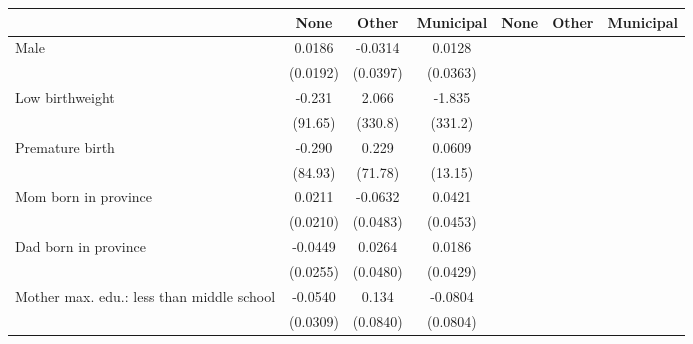 {
\def\sym#1{\ifmmode^{#1}\else\(^{#1}\)\fi}
\begin{tabular}{l*{6}{c}}
\toprule
                    &\multicolumn{1}{c}{None}&\multicolumn{1}{c}{Other}&\multicolumn{1}{c}{Municipal}&\multicolumn{1}{c}{None}&\multicolumn{1}{c}{Other}&\multicolumn{1}{c}{Municipal}\\
\midrule
Male                &      0.0186         &     -0.0314         &      0.0128         &                     &                     &                     \\
                    &    (0.0192)         &    (0.0397)         &    (0.0363)         &                     &                     &                     \\
\addlinespace
Low birthweight     &      -0.231         &       2.066         &      -1.835         &                     &                     &                     \\
                    &     (91.65)         &     (330.8)         &     (331.2)         &                     &                     &                     \\
\addlinespace
Premature birth     &      -0.290         &       0.229         &      0.0609         &                     &                     &                     \\
                    &     (84.93)         &     (71.78)         &     (13.15)         &                     &                     &                     \\
\addlinespace
Mom born in province&      0.0211         &     -0.0632         &      0.0421         &                     &                     &                     \\
                    &    (0.0210)         &    (0.0483)         &    (0.0453)         &                     &                     &                     \\
\addlinespace
Dad born in province&     -0.0449         &      0.0264         &      0.0186         &                     &                     &                     \\
                    &    (0.0255)         &    (0.0480)         &    (0.0429)         &                     &                     &                     \\
\addlinespace
Mother max. edu.: less than middle school&     -0.0540         &       0.134         &     -0.0804         &                     &                     &                     \\
                    &    (0.0309)         &    (0.0840)         &    (0.0804)         &                     &                     &                     \\

\end{tabular}}
